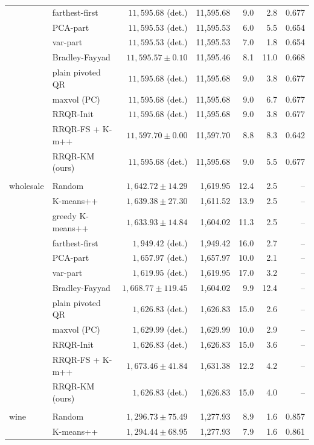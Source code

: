 \begin{table}[htbp]
{\begin{tabular}{llrrrrr}
 & farthest-first & $11,595.68$ (det.) & 11,595.68 & 9.0 & 2.8 & 0.677 \\
 & PCA-part & $11,595.53$ (det.) & 11,595.53 & 6.0 & 5.5 & 0.654 \\
 & var-part & $11,595.53$ (det.) & 11,595.53 & 7.0 & 1.8 & 0.654 \\
 & Bradley-Fayyad & $11,595.57 \pm 0.10$ & 11,595.46 & 8.1 & 11.0 & 0.668 \\
 & plain pivoted QR & $11,595.68$ (det.) & 11,595.68 & 9.0 & 3.8 & 0.677 \\
 & maxvol (PC) & $11,595.68$ (det.) & 11,595.68 & 9.0 & 6.7 & 0.677 \\
 & RRQR-Init & $11,595.68$ (det.) & 11,595.68 & 9.0 & 3.8 & 0.677 \\
 & RRQR-FS + K-m++ & $11,597.70 \pm 0.00$ & 11,597.70 & 8.8 & 8.3 & 0.642 \\
 & RRQR-KM (ours) & $11,595.68$ (det.) & 11,595.68 & 9.0 & 5.5 & 0.677 \\
\addlinespace \\
wholesale & Random & $1,642.72 \pm 14.29$ & 1,619.95 & 12.4 & 2.5 & -- \\
 & K-means++ & $1,639.38 \pm 27.30$ & 1,611.52 & 13.9 & 2.5 & -- \\
 & greedy K-means++ & $1,633.93 \pm 14.84$ & 1,604.02 & 11.3 & 2.5 & -- \\
 & farthest-first & $1,949.42$ (det.) & 1,949.42 & 16.0 & 2.7 & -- \\
 & PCA-part & $1,657.97$ (det.) & 1,657.97 & 10.0 & 2.1 & -- \\
 & var-part & $1,619.95$ (det.) & 1,619.95 & 17.0 & 3.2 & -- \\
 & Bradley-Fayyad & $1,668.77 \pm 119.45$ & 1,604.02 & 9.9 & 12.4 & -- \\
 & plain pivoted QR & $1,626.83$ (det.) & 1,626.83 & 15.0 & 2.6 & -- \\
 & maxvol (PC) & $1,629.99$ (det.) & 1,629.99 & 10.0 & 2.9 & -- \\
 & RRQR-Init & $1,626.83$ (det.) & 1,626.83 & 15.0 & 3.6 & -- \\
 & RRQR-FS + K-m++ & $1,673.46 \pm 41.84$ & 1,631.38 & 12.2 & 4.2 & -- \\
 & RRQR-KM (ours) & $1,626.83$ (det.) & 1,626.83 & 15.0 & 4.0 & -- \\
\addlinespace \\
wine & Random & $1,296.73 \pm 75.49$ & 1,277.93 & 8.9 & 1.6 & 0.857 \\
 & K-means++ & $1,294.44 \pm 68.95$ & 1,277.93 & 7.9 & 1.6 & 0.861 \\

\end{tabular}}
\end{table}

